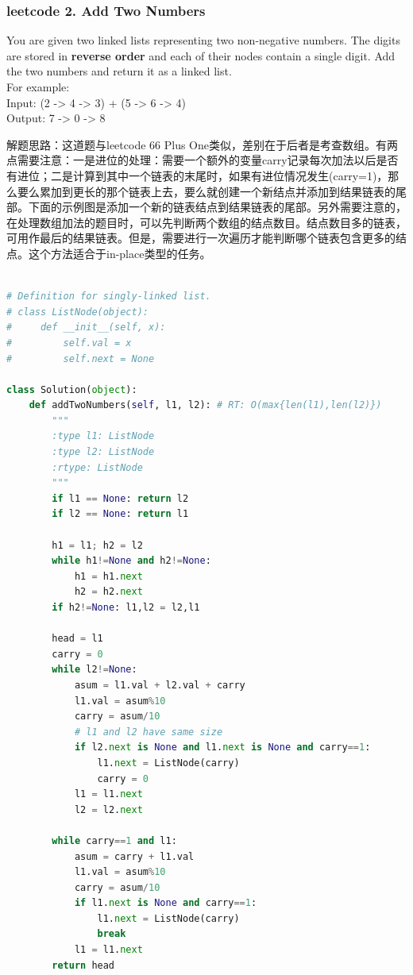 \documentclass[a4paper,10pt]{article}
\begin{document}
\subsubsection{leetcode 2. Add Two Numbers}
You are given two linked lists representing two non-negative numbers. The digits are stored in \textbf{reverse order} and each of their nodes contain a single digit. Add the two numbers and return it as a linked list. \\

\noindent For example: \\
\indent Input: (2 -> 4 -> 3) + (5 -> 6 -> 4) \\
\indent Output: 7 -> 0 -> 8 \\

\begin{CJK*}{UTF8}{gbsn}
\noindent 解题思路：这道题与leetcode 66 Plus One类似，差别在于后者是考查数组。有两点需要注意：一是进位的处理：需要一个额外的变量carry记录每次加法以后是否有进位；二是计算到其中一个链表的末尾时，如果有进位情况发生(carry=1)，那么要么累加到更长的那个链表上去，要么就创建一个新结点并添加到结果链表的尾部。下面的示例图是添加一个新的链表结点到结果链表的尾部。另外需要注意的，在处理数组加法的题目时，可以先判断两个数组的结点数目。结点数目多的链表，可用作最后的结果链表。但是，需要进行一次遍历才能判断哪个链表包含更多的结点。这个方法适合于in-place类型的任务。\\
\end{CJK*}


\begin{lstlisting}[language=Python, caption=Problem2. Add Two Numbers]

# Definition for singly-linked list.
# class ListNode(object):
#     def __init__(self, x):
#         self.val = x
#         self.next = None

class Solution(object):
    def addTwoNumbers(self, l1, l2): # RT: O(max{len(l1),len(l2)})
        """
        :type l1: ListNode
        :type l2: ListNode
        :rtype: ListNode
        """
        if l1 == None: return l2
        if l2 == None: return l1

        h1 = l1; h2 = l2
        while h1!=None and h2!=None:
            h1 = h1.next
            h2 = h2.next
        if h2!=None: l1,l2 = l2,l1

        head = l1
        carry = 0
        while l2!=None:
            asum = l1.val + l2.val + carry
            l1.val = asum%10
            carry = asum/10
            # l1 and l2 have same size
            if l2.next is None and l1.next is None and carry==1:
                l1.next = ListNode(carry)
                carry = 0
            l1 = l1.next
            l2 = l2.next

        while carry==1 and l1:
            asum = carry + l1.val
            l1.val = asum%10
            carry = asum/10
            if l1.next is None and carry==1:
                l1.next = ListNode(carry)
                break
            l1 = l1.next
        return head
\end{lstlisting}
\end{document}
